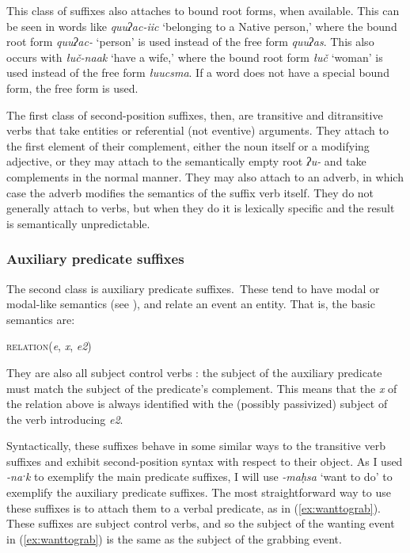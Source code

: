 This class of suffixes also attaches to bound root forms, when available. This can be seen in words like \textit{quuʔac-iic} `belonging to a Native person,' where the bound root form \textit{quuʔac-} `person' is used instead of the free form \textit{quuʔas}. This also occurs with \textit{łuč-naak} `have a wife,' where the bound root form \textit{łuč} `woman' is used instead of the free form \textit{łuucsma}. If a word does not have a special bound form, the free form is used.

The first class of second-position suffixes, then, are transitive and ditransitive verbs that take entities or referential (not eventive) arguments. They attach to the first element of their complement, either the noun itself or a modifying adjective, or they may attach to the semantically empty root \textit{ʔu-} and take complements in the normal manner. They may also attach to an adverb, in which case the adverb modifies the semantics of the suffix verb itself. They do not generally attach to verbs, but when they do it is lexically specific and the result is semantically unpredictable.

\subsubsection{Auxiliary predicate suffixes} \label{ch:clause:2pv:auxiliary}

The second class is auxiliary predicate suffixes. These tend to have modal or modal-like semantics (see \citealt[p.~29--30,71--77]{waldie2012}), and relate an event an entity. That is, the basic semantics are:

\ex
\textsc{relation}(\textit{e}, \textit{x}, \textit{e2})
\xe

\noindent They are also all subject control verbs \citep[p.\ 160]{wojdak2005}: the subject of the auxiliary predicate must match the subject of the predicate's complement. This means that the \textit{x} of the relation above is always identified with the (possibly passivized) subject of the verb introducing \textit{e2}.

Syntactically, these suffixes behave in some similar ways to the transitive verb suffixes and exhibit second-position syntax with respect to their object. As I used \textit{-naˑk} to exemplify the main predicate suffixes, I will use \textit{-maḥsa} `want to do' to exemplify the auxiliary predicate suffixes. The most straightforward way to use these suffixes is to attach them to a verbal predicate, as in (\ref{ex:wanttograb}). These suffixes are subject control verbs, and so the subject of the wanting event in (\ref{ex:wanttograb}) is the same as the subject of the grabbing event.

